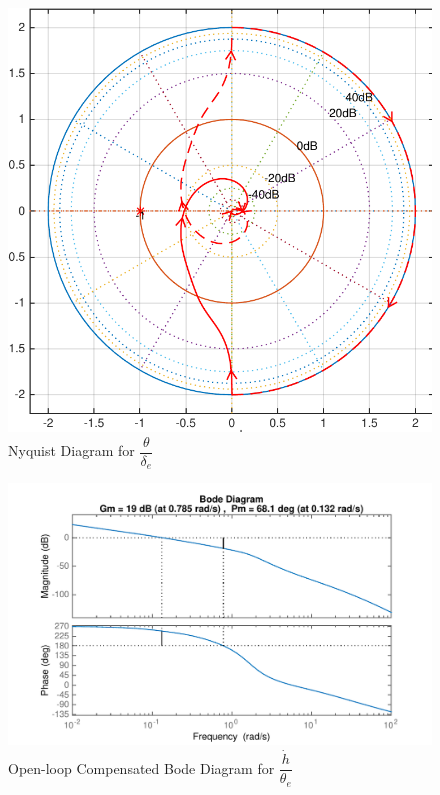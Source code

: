 \documentclass[11pt]{article}
\begin{document}
\begin{figure}[b!]
\begin{center}
\includegraphics[height=.4\textheight]{figures/nyquist_hdot}
\caption{Nyquist Diagram for $\dfrac{\theta}{\delta_e}$}
\end{center}
\end{figure}

\begin{figure}[h!]
\begin{center}
\includegraphics[height=.4\textheight]{figures/open_comp_hdot}
\caption{Open-loop Compensated Bode Diagram for $\dfrac{\dot{h}}{\theta_e}$}
\end{center}
\end{figure}
\end{document}

